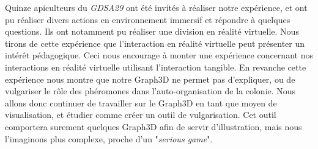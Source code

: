	Quinze apiculteurs du \textit{GDSA29} ont été invités à réaliser notre expérience, et ont pu réaliser divers actions en environnement immersif et répondre à quelques questions. Ils ont notamment pu réaliser une division en réalité virtuelle. Nous tirons de cette expérience que l'interaction en réalité virtuelle peut présenter un intérêt pédagogique. Ceci nous encourage à monter une expérience concernant nos interactions en réalité virtuelle utilisant l'interaction tangible. En revanche cette expérience nous montre que notre Graph3D ne permet pas d'expliquer, ou de vulgariser le rôle des phéromones dans l'auto-organisation de la colonie. Nous allons donc continuer de travailler sur le Graph3D en tant que moyen de visualisation, et étudier comme créer un outil de vulgarisation. Cet outil comportera surement quelques Graph3D afin de servir d'illustration, mais nous l'imaginons plus complexe, proche d'un "\textit{serious game}".